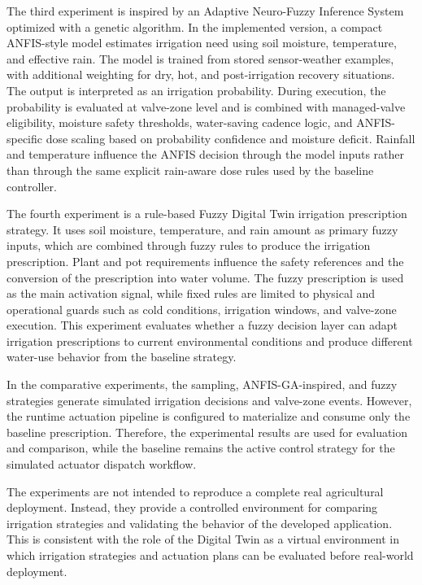 \par The third experiment is inspired by an Adaptive Neuro-Fuzzy Inference System
    optimized with a genetic algorithm. In the implemented version, a compact ANFIS-style
    model estimates irrigation need using soil moisture, temperature, and effective rain.
    The model is trained from stored sensor-weather examples, with additional weighting
    for dry, hot, and post-irrigation recovery situations. The output is interpreted as an
    irrigation probability. During execution, the probability is evaluated at valve-zone
    level and is combined with managed-valve eligibility, moisture safety thresholds,
    water-saving cadence logic, and ANFIS-specific dose scaling based on probability
    confidence and moisture deficit. Rainfall and temperature influence the ANFIS decision
    through the model inputs rather than through the same explicit rain-aware dose rules
    used by the baseline controller.

\par The fourth experiment is a rule-based Fuzzy Digital Twin irrigation prescription
    strategy. It uses soil moisture, temperature, and rain amount as primary fuzzy inputs,
    which are combined through fuzzy rules to produce the irrigation prescription. Plant
    and pot requirements influence the safety references and the conversion of the
    prescription into water volume. The fuzzy prescription is used as the main activation
    signal, while fixed rules are limited to physical and operational guards such as cold
    conditions, irrigation windows, and valve-zone execution. This experiment evaluates
    whether a fuzzy decision layer can adapt irrigation prescriptions to current
    environmental conditions and produce different water-use behavior from the baseline
    strategy.

\par In the comparative experiments, the sampling, ANFIS-GA-inspired, and fuzzy strategies
    generate simulated irrigation decisions and valve-zone events. However, the runtime
    actuation pipeline is configured to materialize and consume only the baseline
    prescription. Therefore, the experimental results are used for evaluation and
    comparison, while the baseline remains the active control strategy for the simulated
    actuator dispatch workflow.

\par The experiments are not intended to reproduce a complete real agricultural
    deployment. Instead, they provide a controlled environment for comparing irrigation
    strategies and validating the behavior of the developed application. This is
    consistent with the role of the Digital Twin as a virtual environment in which
    irrigation strategies and actuation plans can be evaluated before real-world
    deployment.

